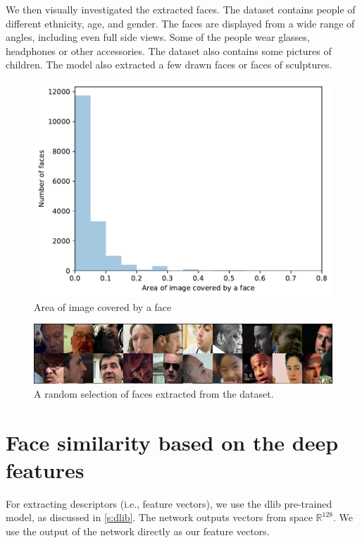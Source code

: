 We then visually investigated the extracted faces. The dataset contains people of different ethnicity, age, and gender. The faces are displayed from a wide range of angles, including even full side views. Some of the people wear glasses, headphones or other accessories. The dataset also contains some pictures of children. The model also extracted a few drawn faces or faces of sculptures.


\begin{figure}
    \centering
    \includegraphics[width=0.7\linewidth]{graphs/faces_size_distribution.pdf}
    \caption{Area of image covered by a face}
    \label{fig:faces_size_distribution}
\end{figure}

\begin{figure}
    \centering
    \includegraphics[width=0.98\linewidth]{img/random_selection_faces.pdf}
    \caption{A random selection of faces extracted from the dataset.}
    \label{fig:random_selection_faces}
\end{figure}

\section{Face similarity based on the deep features}

For extracting descriptors (i.e., feature vectors), we use the dlib pre-trained model, as discussed in \ref{s:dlib}. The network outputs vectors from space $\mathbb{R}^{128}$. We use the output of the network directly as our feature vectors. 

